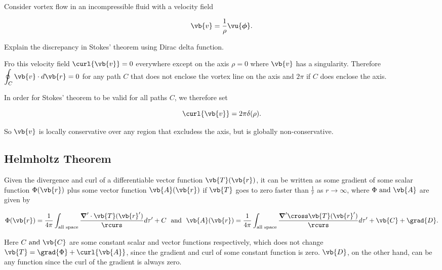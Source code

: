 \documentclass[english,a4paper,12pt]{report}
\begin{document}
{Consider vortex flow in an incompressible fluid with a velocity field

\begin{equation}
	\vb{v} = \frac{1}{\rho } \vu{\boldsymbol{\phi } }. 
\end{equation}

Explain the discrepancy in Stokes' theorem using Dirac delta function.
}
{Fro this velocity field \(\curl{\vb{v} } =0\) everywhere except on the axis \(\rho =0\) where \(\vb{v}\) has a singularity. Therefore \(\displaystyle \oint_{C} \vb{v} \cdot d\vb{r} =0\) for any path \(C\) that does not enclose the vortex line on the axis and \(2\pi \) if \(C\) does enclose the axis.

In order for Stokes' theorem to be valid for all paths \(C\), we therefore set 

\begin{equation}
	\curl{\vb{v} } = 2\pi \delta (\rho ).
\end{equation}

So \(\vb{v} \) is locally conservative over any region that excludess the axis, but is globally non-conservative. 

} 


	
\subsection{Helmholtz Theorem}

\begin{theorem}
Given the divergence and curl of a differentiable vector function \(\vb{T}(\vb{r} ) \), it can be written as some gradient of some scalar function \(\Phi(\vb{r} ) \) plus some vector function \(\vb{A}(\vb{r} ) \) if \(\vb{T} \) goes to zero faster than \(\displaystyle \frac{1}{r} \) as \(r \to \infty\), where \(\Phi \text { and } \vb{A} \) are given by

\begin{equation}
	\Phi(\vb{r} ) = \frac{1}{4\pi } \int_{\text{all space} } \frac{\boldsymbol{\nabla}' \cdot \vb{T} (\vb{r} ')}{\rcurs } d\tau ' + C~\text { and }~ \vb{A} (\vb{r} ) = \frac{1}{4\pi } \int_{\text{all space} } \frac{\boldsymbol{\nabla}' \cross \vb{T} (\vb{r} ')}{\rcurs } d\tau ' + \vb{C} + \grad{D} .
\end{equation}

Here \(C \text { and }  \vb{C} \) are some constant scalar and vector functions respectively, which does not change \(\vb{T} = \grad{\Phi } + \curl{\vb{A} }\), since the gradient and curl of some constant function is zero. \(\vb{D}\), on the other hand, can be any function since the curl of the gradient is always zero. 

\end{theorem}
\end{document}
